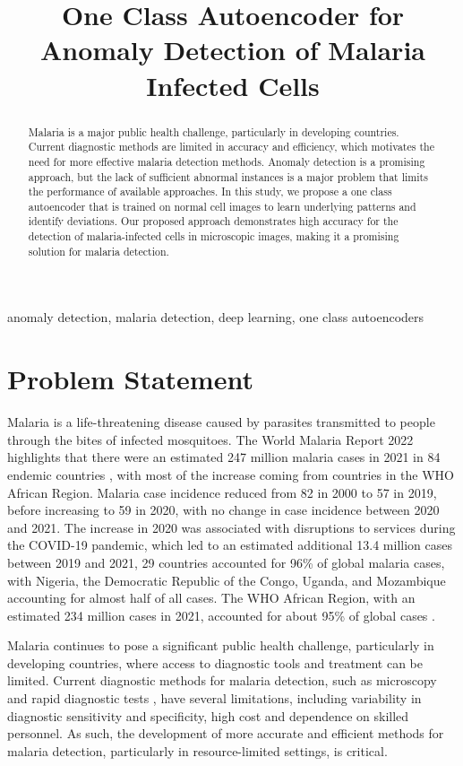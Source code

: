 \documentclass[journal,12pt,onecolumn,draftcls]{IEEEtran}
\begin{document}
\title{One Class Autoencoder for Anomaly Detection of Malaria Infected Cells}
\author{}
\maketitle
\begin{abstract}
    Malaria is a major public health challenge, particularly in developing countries. Current diagnostic methods are limited in accuracy and efficiency, which motivates the need for more effective malaria detection methods. Anomaly detection is a promising approach, but the lack of sufficient abnormal instances is a major problem that limits the performance of available approaches. In this study, we propose a one class autoencoder that is trained on normal cell images to learn underlying patterns and identify deviations. Our proposed approach demonstrates high accuracy for the detection of malaria-infected cells in microscopic images, making it a promising solution for malaria detection.
\end{abstract}

\begin{IEEEkeywords}
anomaly detection, malaria detection, deep learning, one class autoencoders
\end{IEEEkeywords}

\section{Problem Statement}
Malaria is a life-threatening disease caused by parasites transmitted to people through the bites of infected mosquitoes. The World Malaria Report 2022 highlights that there were an estimated 247 million malaria cases in 2021 in 84 endemic countries \cite{who2022}, with most of the increase coming from countries in the WHO African Region. Malaria case incidence reduced from 82 in 2000 to 57 in 2019, before increasing to 59 in 2020, with no change in case incidence between 2020 and 2021. The increase in 2020 was associated with disruptions to services during the COVID-19 pandemic, which led to an estimated additional 13.4 million cases between 2019 and 2021, 29 countries accounted for 96\% of global malaria cases, with Nigeria, the Democratic Republic of the Congo, Uganda, and Mozambique accounting for almost half of all cases. The WHO African Region, with an estimated 234 million cases in 2021, accounted for about 95\% of global cases \cite{who2022}.

Malaria continues to pose a significant public health challenge, particularly in developing countries, where access to diagnostic tools and treatment can be limited. Current diagnostic methods for malaria detection, such as microscopy and rapid diagnostic tests \cite{wilson2012}, have several limitations, including variability in diagnostic sensitivity and specificity, high cost and dependence on skilled personnel. As such, the development of more accurate and efficient methods for malaria detection, particularly in resource-limited settings, is critical.
\end{document}
